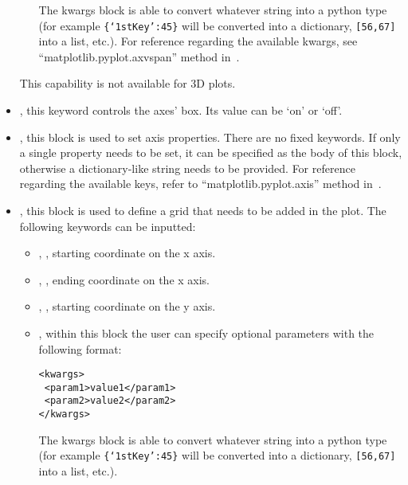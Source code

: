 \begin{itemize}
\begin{itemize}
  The kwargs block is able to convert whatever string into a python type (for
  example \texttt{\{`1stKey':45\}} will
  be converted into a dictionary, 
  \texttt{[56,67]} into a list, etc.).
    For reference regarding the available kwargs, see
    ``matplotlib.pyplot.axvspan'' method in~\cite{MatPlotLib}.
  \end{itemize}
  \nb This capability is not available for 3D plots.
  \item {}, this keyword controls the axes' box.
  Its value can be `on' or `off'.
  \item {}, this block is used to set axis properties.
  There are no fixed keywords.
  If only a single property needs to be set, it can be specified as the body of
  this block, otherwise a dictionary-like string needs to be provided.
  For reference regarding the available keys, refer to
  ``matplotlib.pyplot.axis'' method in~\cite{MatPlotLib}.
  \item {}, this block is used to define a grid that needs to be
  added in the plot.
  The following keywords can be inputted:
  \begin{itemize}
    \item {}, , starting coordinate on the x
    axis.
    \item {}, , ending coordinate on the
    x axis.
    \item {}, , starting coordinate on
    the y axis.
    \item {}, within this block the user can specify optional
    parameters with the following format:

\begin{lstlisting}[style=XML]
<kwargs>
 <param1>value1</param1>
 <param2>value2</param2>
</kwargs>
\end{lstlisting}

  The kwargs block is able to convert whatever string into a python type (for
  example \texttt{\{`1stKey':45\}} will
  be converted into a dictionary, 
  \texttt{[56,67]} into a list, etc.).
  \end{itemize}
  \vspace{-5mm}
\end{itemize}
